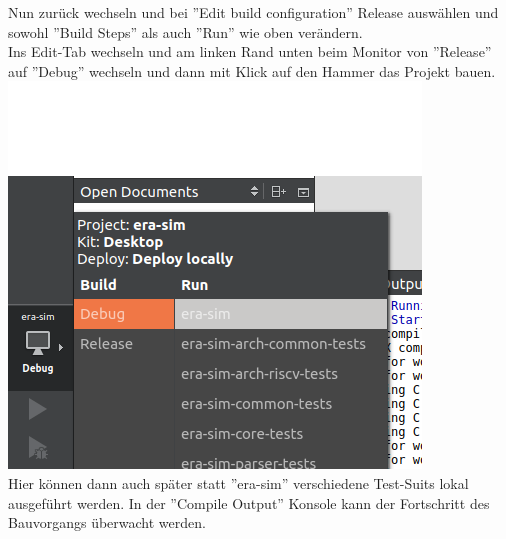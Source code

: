 Nun zurück wechseln und bei ''Edit build configuration'' Release auswählen und
sowohl ''Build Steps'' als auch ''Run'' wie oben verändern.\\

Ins Edit-Tab wechseln und am linken Rand unten beim Monitor von ''Release'' auf
''Debug'' wechseln und dann mit Klick auf den Hammer das Projekt bauen.\\
\includegraphics[scale=0.7]{images/setup-qtcreator-change-buildrun-flavor.png}\\
Hier können dann auch später statt ''era-sim'' verschiedene Test-Suits lokal
ausgeführt werden. In der ''Compile Output'' Konsole kann der Fortschritt des
Bauvorgangs überwacht werden.\\


